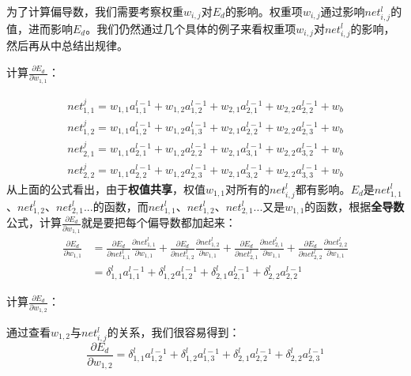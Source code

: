 为了计算偏导数，我们需要考察权重\(w_{i,j}\)对\(E_d\)的影响。权重项\(w_{i,j}\)通过影响\(net^l_{i,j}\)的值，进而影响\(E_d\)。我们仍然通过几个具体的例子来看权重项\(w_{i,j}\)对\(net^l_{i,j}\)的影响，然后再从中总结出规律。

\begin{example}
	计算\(\frac{\partial{E_d}}{\partial{w_{1,1}}}\)：
\end{example}

\begin{align*}
	net^j_{1,1}=w_{1,1}a^{l-1}_{1,1}+w_{1,2}a^{l-1}_{1,2}+w_{2,1}a^{l-1}_{2,1}+w_{2,2}a^{l-1}_{2,2}+w_b \\
	net^j_{1,2}=w_{1,1}a^{l-1}_{1,2}+w_{1,2}a^{l-1}_{1,3}+w_{2,1}a^{l-1}_{2,2}+w_{2,2}a^{l-1}_{2,3}+w_b \\
	net^j_{2,1}=w_{1,1}a^{l-1}_{2,1}+w_{1,2}a^{l-1}_{2,2}+w_{2,1}a^{l-1}_{3,1}+w_{2,2}a^{l-1}_{3,2}+w_b \\
	net^j_{2,2}=w_{1,1}a^{l-1}_{2,2}+w_{1,2}a^{l-1}_{2,3}+w_{2,1}a^{l-1}_{3,2}+w_{2,2}a^{l-1}_{3,3}+w_b
\end{align*}
从上面的公式看出，由于\textbf{权值共享}，权值\(w_{1,1}\)对所有的\(net^l_{i,j}\)都有影响。\(E_d\)是\(net^l_{1,1}\)、\(net^l_{1,2}\)、\(net^l_{2,1}\)...的函数，而\(net^l_{1,1}\)、\(net^l_{1,2}\)、\(net^l_{2,1}\)...又是\(w_{1,1}\)的函数，根据\textbf{全导数}公式，计算\(\frac{\partial{E_d}}{\partial{w_{1,1}}}\)就是要把每个偏导数都加起来：
\begin{align*}
	\frac{\partial{E_d}}{\partial{w_{1,1}}} & =\frac{\partial{E_d}}{\partial{net^{l}_{1,1}}}\frac{\partial{net^{l}_{1,1}}}{\partial{w_{1,1}}}+\frac{\partial{E_d}}{\partial{net^{l}_{1,2}}}\frac{\partial{net^{l}_{1,2}}}{\partial{w_{1,1}}}+\frac{\partial{E_d}}{\partial{net^{l}_{2,1}}}\frac{\partial{net^{l}_{2,1}}}{\partial{w_{1,1}}}+\frac{\partial{E_d}}{\partial{net^{l}_{2,2}}}\frac{\partial{net^{l}_{2,2}}}{\partial{w_{1,1}}} \\
	                                        & =\delta^l_{1,1}a^{l-1}_{1,1}+\delta^l_{1,2}a^{l-1}_{1,2}+\delta^l_{2,1}a^{l-1}_{2,1}+\delta^l_{2,2}a^{l-1}_{2,2}
\end{align*}

\begin{example}
	计算\(\frac{\partial{E_d}}{\partial{w_{1,2}}}\)：
\end{example}

通过查看\(w_{1,2}\)与\(net^l_{i,j}\)的关系，我们很容易得到：
\[
	\frac{\partial{E_d}}{\partial{w_{1,2}}}=\delta^l_{1,1}a^{l-1}_{1,2}+\delta^l_{1,2}a^{l-1}_{1,3}+\delta^l_{2,1}a^{l-1}_{2,2}+\delta^l_{2,2}a^{l-1}_{2,3}
\]


